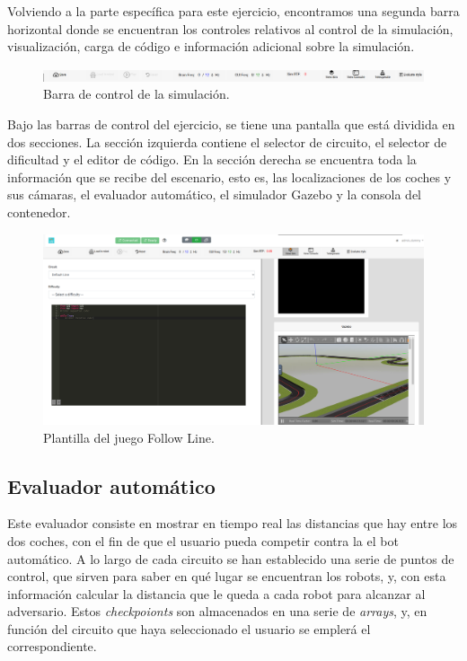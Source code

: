 \documentclass[a4paper, 12pt]{book}
\begin{document}
Volviendo a la parte específica para este ejercicio, encontramos una segunda barra horizontal donde se encuentran los controles relativos al control de la simulación, visualización, carga de código e información adicional sobre la simulación.

\begin{figure}[H]
	\centering
    \includegraphics[width=15cm]{img/barra_control.png}
    \caption{Barra de control de la simulación.}
\end{figure}

Bajo las barras de control del ejercicio, se tiene una pantalla que está dividida en dos secciones. La sección izquierda contiene el selector de circuito, el selector de dificultad y el editor de código. En la sección derecha se encuentra toda la información que se recibe del escenario, esto es, las localizaciones de los coches y sus cámaras, el evaluador automático, el simulador Gazebo y la consola del contenedor.


\begin{figure}[H]
	\centering
    \includegraphics[width=15cm]{img/follow_line_game.png}
    \caption{Plantilla del juego Follow Line.}
\end{figure}

\subsection{Evaluador automático}
\label{follow_line_game_evaluator}

Este evaluador consiste en mostrar en tiempo real las distancias que hay entre los dos coches, con el fin de que el usuario pueda competir contra la el bot automático. A lo largo de cada circuito se han establecido una serie de puntos de control, que sirven para saber en qué lugar se encuentran los robots, y, con esta información calcular la distancia que le queda a cada robot para alcanzar al adversario. Estos \emph{checkpoionts} son almacenados en una serie de \emph{arrays}, y, en función del circuito que haya seleccionado el usuario se emplerá el correspondiente.
\end{document}
